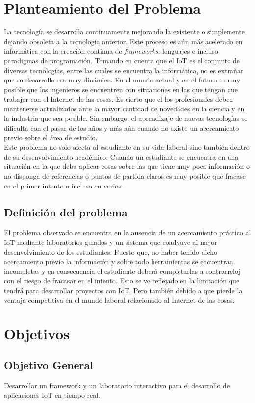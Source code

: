 \section{Planteamiento del Problema}
La tecnología se desarrolla continuamente mejorando la existente o simplemente dejando obsoleta
a la tecnología anterior. Este proceso es aún más acelerado en informática con la creación
continua de \textit{frameworks}, lenguajes e incluso paradigmas de programación. Tomando en cuenta
que el IoT es el conjunto de diversas tecnologías, entre las cuales se encuentra la informática,
no es extrañar que su desarrollo sea muy dinámico. En el mundo actual y en el futuro es muy
posible que los ingenieros se encuentren con situaciones en las que tengan que trabajar con el
Internet de las cosas. Es cierto que el los profesionales deben mantenerse actualizados ante la
mayor cantidad de novedades en la ciencia y en la industria que sea posible. Sin embargo, el aprendizaje de
nuevas tecnologías se dificulta con el pasar de los años y más aún cuando no existe un acercamiento
previo sobre el área de estudio.\\
Este problema no solo afecta al estudiante en su vida laboral sino también dentro de su desenvolvimiento
académico. Cuando un estudiante se encuentra en una situación en la que deba
aplicar cosas sobre las que tiene muy poca información o no disponga de referencias o puntos
de partida claros es muy posible que fracase en el primer intento o incluso en varios.
\subsection{Definición del problema}
El problema observado se encuentra en la ausencia de un acercamiento práctico al IoT mediante
laboratorios guiados y un sistema que coadyuve al mejor desenvolvimiento de los estudiantes.
Puesto que, no haber tenido dicho acercamiento previo la información y sobre todo herramientas
se encuentran incompletas y en consecuencia el estudiante deberá completarlas a contrarreloj
con el riesgo de fracasar en el intento. Esto se ve reflejado en la limitación que tendrá para
desarrollar proyectos con IoT. Pero también debido a que pierde la ventaja competitiva en el
mundo laboral relacionado al Internet de las cosas.
\section{Objetivos}
\subsection{Objetivo General}
Desarrollar un framework y un laboratorio interactivo para el desarrollo de aplicaciones IoT en
tiempo real.
